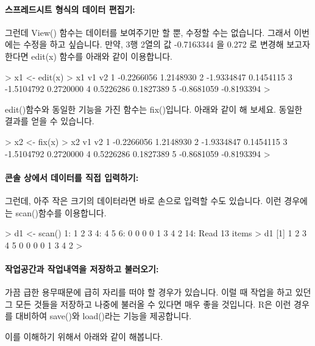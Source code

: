 \documentclass[tutorial.tex]{subfiles}
\begin{document}
\paragraph{스프레드시트 형식의 데이터 편집기:}
그런데 View() 함수는 데이터를 보여주기만 할 뿐, 수정할 수는 없습니다.
그래서 이번에는 수정을 하고 싶습니다. 
만약, 3행 2열의 값 -0.7163344 을 0.272 로 변경해 보고자 한다면 edit(x) 함수를 아래와 같이 이용합니다.
\begin{Schunk}
\begin{Soutput}
> x1 <- edit(x)
> x1
          v1         v2
1 -0.2266056  1.2148930
2 -1.9334847  0.1454115
3 -1.5104792  0.2720000
4  0.5226286  0.1827389
5 -0.8681059 -0.8193394
> 
\end{Soutput}
\end{Schunk}

edit()함수와 동일한 기능을 가진 함수는 fix()입니다. 
아래와 같이 해 보세요. 동일한 결과를 얻을 수 있습니다. 
\begin{Schunk}
\begin{Soutput}
> x2 <- fix(x)
> x2
          v1         v2
1 -0.2266056  1.2148930
2 -1.9334847  0.1454115
3 -1.5104792  0.2720000
4  0.5226286  0.1827389
5 -0.8681059 -0.8193394
> 
\end{Soutput}
\end{Schunk}

\paragraph{콘솔 상에서 데이터를 직접 입력하기:}
그런데, 아주 작은 크기의 데이터라면 바로 손으로 입력할 수도 있습니다.
이런 경우에는 scan()함수를 이용합니다. 

\begin{Schunk}
\begin{Soutput}
> d1 <- scan()
1: 1 2 3 
4: 4 5 
6: 0 0 0 0 1 3 4 2 
14: 
Read 13 items
> d1
 [1] 1 2 3 4 5 0 0 0 0 1 3 4 2
> 
\end{Soutput}
\end{Schunk}

\paragraph{작업공간과 작업내역을 저장하고 불러오기:}
가끔 급한 용무때문에 급히 자리를 떠야 할 경우가 있습니다. 
이럴 때 작업을 하고 있던 그 모든 것들을 저장하고 나중에 불러올 수 있다면 매우 좋을 것입니다.
R은 이런 경우를 대비하여 save()와 load()라는 기능을 제공합니다. 

이를 이해하기 위해서 아래와 같이 해봅니다. 
\end{document}
